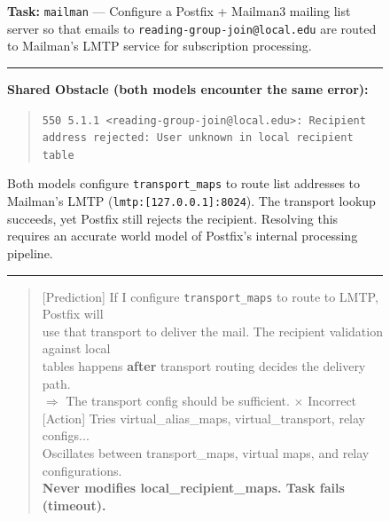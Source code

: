 \documentclass{llmxive}
\begin{document}
\begin{figure}[t]
\centering
\small
\begin{tcolorbox}[
  colback=gray!3, colframe=black!50, boxrule=0.5pt,
  title={\textbf{Case Study: Accurate Environment Prediction Enables Action Refinement}},
  fonttitle=\bfseries\small, boxrule=0.5pt, arc=2pt
]

\textbf{Task:} \texttt{mailman} --- Configure a Postfix + Mailman3 mailing list server so that emails to \texttt{reading-group-join@local.edu} are routed to Mailman's LMTP service for subscription processing.

\vspace{4pt}
\hrule
\vspace{6pt}

\textbf{Shared Obstacle (both models encounter the same error):}

\vspace{2pt}
\begin{quote}
\ttfamily\scriptsize
\texttt{550 5.1.1 <reading-group-join@local.edu>: Recipient address rejected: User unknown in local recipient table}
\end{quote}

\vspace{2pt}
\noindent Both models configure \texttt{transport\_maps} to route list addresses to Mailman's LMTP (\texttt{lmtp:[127.0.0.1]:8024}). The transport lookup succeeds, yet Postfix still rejects the recipient. Resolving this requires an accurate world model of Postfix's internal processing pipeline.

\vspace{6pt}
\hrule
\vspace{6pt}

\begin{tcolorbox}[colback=casebefore!5!white, colframe=casebefore, boxrule=0.4pt, arc=1pt, title={\textbf{Before LWM RL}}, fonttitle=\small]

\begin{quote}
\ttfamily\scriptsize
[Prediction] If I configure \texttt{transport\_maps} to route to LMTP, Postfix will\\
use that transport to deliver the mail. The recipient validation against local\\
tables happens \textbf{after} transport routing decides the delivery path.\\
$\Rightarrow$ The transport config should be sufficient. $\times$ Incorrect\\[4pt]
[Action] Tries virtual\_alias\_maps, virtual\_transport, relay configs...\\
Oscillates between transport\_maps, virtual maps, and relay configurations.\\
\textbf{Never modifies local\_recipient\_maps. Task fails (timeout).}
\end{quote}
\end{tcolorbox}


\end{tcolorbox}
\end{figure}
\end{document}
